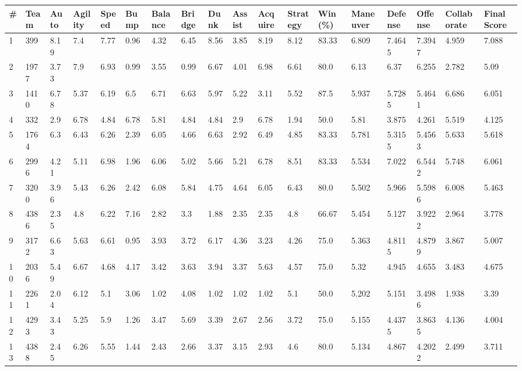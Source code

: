 \documentclass[landscape, 10pt]{report}
\begin{document}
\begin{longtable}{l || l || l | l | l | l | l | l | l | l | l | l | l || l | l | l | l | l} 
\# & Team & Auto & Agility & Speed & Bump & Balance & Bridge & Dunk & Assist & Acquire & Strategy & Win (\%) & Maneuver & Defense & Offense & Collaborate & Final Score \\ \hline \endhead 
\rowcolor{lightgray}1 & 399 & 8.19 & 7.4 & 7.77 & 0.96 & 4.32 & 6.45 & 8.56 & 3.85 & 8.19 & 8.12 & 83.33 & 6.809 & 7.4645 & 7.3947 & 4.959 & 7.088\\ 
2 & 1977 & 3.73 & 7.9 & 6.93 & 0.99 & 3.55 & 0.99 & 6.67 & 4.01 & 6.98 & 6.61 & 80.0 & 6.13 & 6.37 & 6.255 & 2.782 & 5.09\\ 
\rowcolor{lightgray}3 & 1410 & 6.78 & 5.37 & 6.19 & 6.5 & 6.71 & 6.63 & 5.97 & 5.22 & 3.11 & 5.52 & 87.5 & 5.937 & 5.7285 & 5.4641 & 6.686 & 6.051\\ 
4 & 332 & 2.9 & 6.78 & 4.84 & 6.78 & 5.81 & 4.84 & 4.84 & 2.9 & 6.78 & 1.94 & 50.0 & 5.81 & 3.875 & 4.261 & 5.519 & 4.125\\ 
\rowcolor{lightgray}5 & 1764 & 6.3 & 6.43 & 6.26 & 2.39 & 6.05 & 4.66 & 6.63 & 2.92 & 6.49 & 4.85 & 83.33 & 5.781 & 5.3155 & 5.4563 & 5.633 & 5.618\\ 
6 & 2996 & 4.21 & 5.11 & 6.98 & 1.96 & 6.06 & 5.02 & 5.66 & 5.21 & 6.78 & 8.51 & 83.33 & 5.534 & 7.022 & 6.5442 & 5.748 & 6.061\\ 
\rowcolor{lightgray}7 & 3200 & 3.96 & 5.43 & 6.26 & 2.42 & 6.08 & 5.84 & 4.75 & 4.64 & 6.05 & 6.43 & 80.0 & 5.502 & 5.966 & 5.5986 & 6.008 & 5.463\\ 
8 & 4386 & 2.35 & 4.8 & 6.22 & 7.16 & 2.82 & 3.3 & 1.88 & 2.35 & 2.35 & 4.8 & 66.67 & 5.454 & 5.127 & 3.9222 & 2.964 & 3.778\\ 
\rowcolor{lightgray}9 & 3172 & 6.63 & 5.63 & 6.61 & 0.95 & 3.93 & 3.72 & 6.17 & 4.36 & 3.23 & 4.26 & 75.0 & 5.363 & 4.8115 & 4.8799 & 3.867 & 5.007\\ 
10 & 2036 & 5.49 & 6.67 & 4.68 & 4.17 & 3.42 & 3.63 & 3.94 & 3.37 & 5.63 & 4.57 & 75.0 & 5.32 & 4.945 & 4.655 & 3.483 & 4.675\\ 
\rowcolor{lightgray}11 & 2261 & 2.04 & 6.12 & 5.1 & 3.06 & 1.02 & 4.08 & 1.02 & 1.02 & 1.02 & 5.1 & 50.0 & 5.202 & 5.151 & 3.4986 & 1.938 & 3.39\\ 
12 & 4293 & 3.43 & 5.25 & 5.9 & 1.26 & 3.47 & 5.69 & 3.39 & 2.67 & 2.56 & 3.72 & 75.0 & 5.155 & 4.4375 & 3.8635 & 4.136 & 4.004\\ 
\rowcolor{lightgray}13 & 4388 & 2.45 & 6.26 & 5.55 & 1.44 & 2.43 & 2.66 & 3.37 & 3.15 & 2.93 & 4.6 & 80.0 & 5.134 & 4.867 & 4.2022 & 2.499 & 3.711\\ 

\end{longtable}
\end{document}
